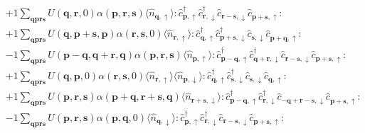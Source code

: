 \begin{align*}
	&+1 \sum_{ \mathbf{q} \mathbf{p} \mathbf{r} \mathbf{s} } U( \mathbf{q}, \mathbf{r}, 0 )  \alpha( \mathbf{p}, \mathbf{r}, \mathbf{s} )   \langle \hat{n}_{ \mathbf{q}, \uparrow } \rangle :\hat{c}_{ \mathbf{p}, \uparrow }^\dagger \hat{c}_{ \mathbf{r}, \downarrow }^\dagger \hat{c}_{ \mathbf{r}-\mathbf{s}, \downarrow }^{\phantom{\dagger}}\hat{c}_{ \mathbf{p}+\mathbf{s}, \uparrow }^{\phantom{\dagger}}: \\
	&+1 \sum_{ \mathbf{q} \mathbf{p} \mathbf{r} \mathbf{s} } U( \mathbf{q}, \mathbf{p}+\mathbf{s}, \mathbf{p} )  \alpha( \mathbf{r}, \mathbf{s}, 0 )   \langle \hat{n}_{ \mathbf{r}, \uparrow } \rangle :\hat{c}_{ \mathbf{q}, \uparrow }^\dagger \hat{c}_{ \mathbf{p}+\mathbf{s}, \downarrow }^\dagger \hat{c}_{ \mathbf{s}, \downarrow }^{\phantom{\dagger}}\hat{c}_{ \mathbf{p}+\mathbf{q}, \uparrow }^{\phantom{\dagger}}: \\
	&-1 \sum_{ \mathbf{q} \mathbf{p} \mathbf{r} \mathbf{s} } U( \mathbf{p}-\mathbf{q}, \mathbf{q}+\mathbf{r}, \mathbf{q} )  \alpha( \mathbf{p}, \mathbf{r}, \mathbf{s} )   \langle \hat{n}_{ \mathbf{p}, \uparrow } \rangle :\hat{c}_{ \mathbf{p}-\mathbf{q}, \uparrow }^\dagger \hat{c}_{ \mathbf{q}+\mathbf{r}, \downarrow }^\dagger \hat{c}_{ \mathbf{r}-\mathbf{s}, \downarrow }^{\phantom{\dagger}}\hat{c}_{ \mathbf{p}+\mathbf{s}, \uparrow }^{\phantom{\dagger}}: \\
	&+1 \sum_{ \mathbf{q} \mathbf{p} \mathbf{r} \mathbf{s} } U( \mathbf{q}, \mathbf{p}, 0 )  \alpha( \mathbf{r}, \mathbf{s}, 0 )   \langle \hat{n}_{ \mathbf{r}, \uparrow } \rangle \langle \hat{n}_{ \mathbf{p}, \downarrow } \rangle :\hat{c}_{ \mathbf{q}, \uparrow }^\dagger \hat{c}_{ \mathbf{s}, \downarrow }^\dagger \hat{c}_{ \mathbf{s}, \downarrow }^{\phantom{\dagger}}\hat{c}_{ \mathbf{q}, \uparrow }^{\phantom{\dagger}}: \\
	&+1 \sum_{ \mathbf{q} \mathbf{p} \mathbf{r} \mathbf{s} } U( \mathbf{p}, \mathbf{r}, \mathbf{s} )  \alpha( \mathbf{p}+\mathbf{q}, \mathbf{r}+\mathbf{s}, \mathbf{q} )   \langle \hat{n}_{ \mathbf{r}+\mathbf{s}, \downarrow } \rangle :\hat{c}_{ \mathbf{p}-\mathbf{q}, \uparrow }^\dagger \hat{c}_{ \mathbf{r}, \downarrow }^\dagger \hat{c}_{ -\mathbf{q}+\mathbf{r}-\mathbf{s}, \downarrow }^{\phantom{\dagger}}\hat{c}_{ \mathbf{p}+\mathbf{s}, \uparrow }^{\phantom{\dagger}}: \\
	&-1 \sum_{ \mathbf{q} \mathbf{p} \mathbf{r} \mathbf{s} } U( \mathbf{p}, \mathbf{r}, \mathbf{s} )  \alpha( \mathbf{p}, \mathbf{q}, 0 )   \langle \hat{n}_{ \mathbf{q}, \downarrow } \rangle :\hat{c}_{ \mathbf{p}, \uparrow }^\dagger \hat{c}_{ \mathbf{r}, \downarrow }^\dagger \hat{c}_{ \mathbf{r}-\mathbf{s}, \downarrow }^{\phantom{\dagger}}\hat{c}_{ \mathbf{p}+\mathbf{s}, \uparrow }^{\phantom{\dagger}}: \\

\end{align*}
